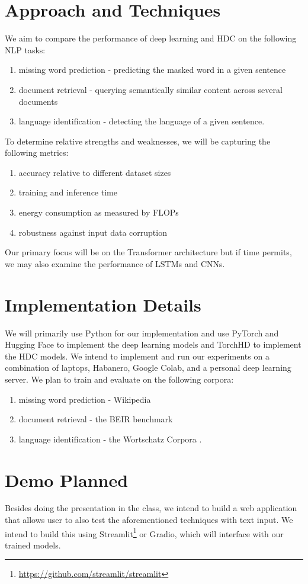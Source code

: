 \documentclass[12pt]{article}
\begin{document}
\section{Approach and Techniques}
We aim to compare the performance of deep learning and HDC on the following NLP tasks: 
\begin{enumerate}
    \item missing word prediction - predicting the masked word in a given sentence
    \item document retrieval - querying semantically similar content across several documents
    \item language identification - detecting the language of a given sentence.
\end{enumerate}

To determine relative strengths and weaknesses, we will be capturing the following metrics:
\begin{enumerate}
    \item accuracy relative to different dataset sizes
    \item training and inference time
    \item energy consumption as measured by FLOPs \cite{desislavov2021compute}
    \item robustness against input data corruption
\end{enumerate}

Our primary focus will be on the Transformer architecture but if time permits, we may also examine the performance of LSTMs and CNNs.

\section{Implementation Details}
We will primarily use Python for our implementation and use PyTorch and Hugging Face \cite{HF} to implement the deep learning models and TorchHD \cite{torchhd} to implement the HDC models. We intend to implement and run our experiments on a combination of laptops, Habanero, Google Colab, and a personal deep learning server. We plan to train and evaluate on the following corpora:
\begin{enumerate}
    \item missing word prediction - Wikipedia \cite{wikipedia}
    \item document retrieval - the BEIR benchmark \cite{BEIR}
    \item language identification - the Wortschatz Corpora \cite{quasthoff-etal-2006-corpus}.
\end{enumerate}

\section{Demo Planned}
Besides doing the presentation in the class, we intend to build a web application that allows user to also test the aforementioned techniques with text input. We intend to build this using Streamlit\footnote{\url{https://github.com/streamlit/streamlit}} or Gradio\cite{abid2019gradio}, which will interface with our trained models.

\printbibliography
\end{document}
